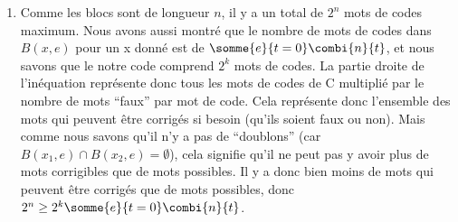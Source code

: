 \documentclass[10p,a4paper]{scrartcl}
\renewcommand{\(}{\left(}
\renewcommand{\)}{\right)}
\begin{document}
\begin{enumerate}
	\item 	Comme les blocs sont de longueur $n$, il y a un total de $2^n$ mots de codes maximum. Nous avons aussi montré que le nombre de mots de codes dans $B(x,e)$ pour un x donné est de $\somme{e}{t=0}\combi{n}{t}$, et nous savons que le notre code comprend $2^k$ mots de codes. La partie droite de l'inéquation représente donc tous les mots de codes de C multiplié par le nombre de mots \enquote{faux} par mot de code. Cela représente donc l'ensemble des mots qui peuvent être corrigés si besoin (qu'ils soient faux ou non). Mais comme nous savons qu'il n'y a pas de \enquote{doublons} (car $B(x_1,e) \cap B(x_2,e) = \emptyset$), cela signifie qu'il ne peut pas y avoir plus de mots corrigibles que de mots possibles. Il y a donc bien moins de mots qui peuvent être corrigés que de mots possibles, donc $2^n \geq 2^k \somme{e}{t=0}\combi{n}{t}$. 
\end{enumerate}
\end{document}
